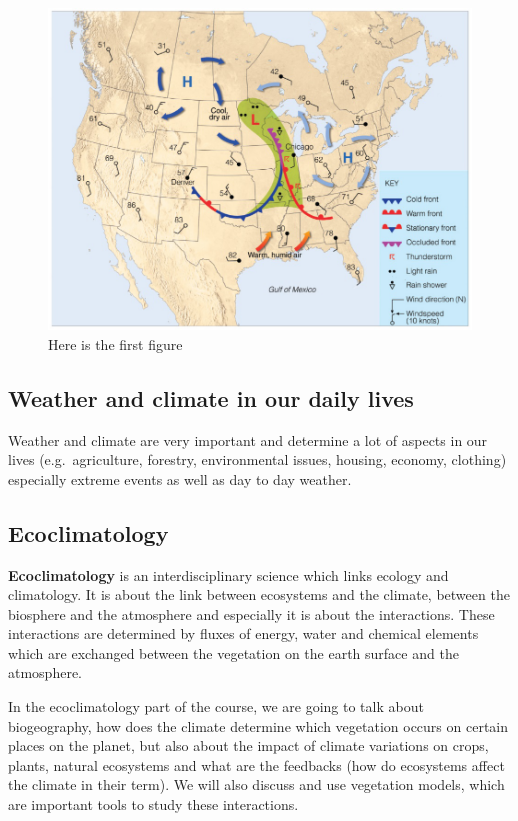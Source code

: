 \documentclass[oneside]{book}
\begin{document}
\begin{figure}

{\centering \includegraphics[width=0.5\linewidth]{figures/Figure18} 

}

\caption{Here is the first figure}\label{fig:History2}
\end{figure}

\subsection{Weather and climate in our daily
lives}\label{weather-and-climate-in-our-daily-lives}

Weather and climate are very important and determine a lot of aspects in
our lives (e.g.~agriculture, forestry, environmental issues, housing,
economy, clothing) especially extreme events as well as day to day
weather.

\subsection{Ecoclimatology}\label{ecoclimatology}

\textbf{Ecoclimatology} is an interdisciplinary science which links
ecology and climatology. It is about the link between ecosystems and the
climate, between the biosphere and the atmosphere and especially it is
about the interactions. These interactions are determined by fluxes of
energy, water and chemical elements which are exchanged between the
vegetation on the earth surface and the atmosphere.

In the ecoclimatology part of the course, we are going to talk about
biogeography, how does the climate determine which vegetation occurs on
certain places on the planet, but also about the impact of climate
variations on crops, plants, natural ecosystems and what are the
feedbacks (how do ecosystems affect the climate in their term). We will
also discuss and use vegetation models, which are important tools to
study these interactions.
\end{document}
